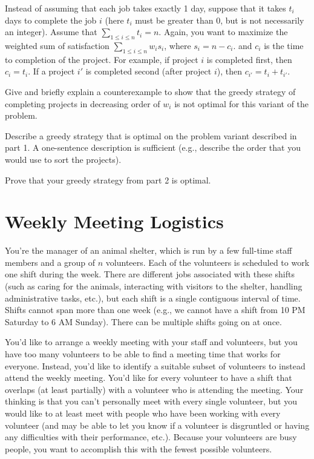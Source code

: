 \documentclass[11pt,fleqn]{exam}
\newif\ifsolutions\solutionsfalse
\begin{document}
\begin{questions}
    \question[3] Instead of assuming that each job takes exactly 1 day, suppose that it takes $t_i$ days to complete the job $i$ (here $t_i$ must be greater than 0, but is not necessarily an integer). Assume that $\sum_{1 \leq i \leq n}t_i = n$. Again, you want to maximize the weighted sum of satisfaction $\sum_{1 \leq i \leq n} w_i s_i$, where $s_i = n-c_i$. and $c_i$ is the time to completion of the project. For example, if project $i$ is completed first, then $c_i = t_i$. If a project $i'$ is completed second (after project $i$), then $c_{i'} =t_i + t_{i'}$.
	
	Give and briefly explain a counterexample to show that the greedy strategy of completing projects in decreasing order of $w_i$ is not optimal for this variant of the problem.

    \ifsolutions  \fi

    \question[2] Describe a greedy strategy that is optimal on the problem variant described in part 1. A one-sentence description is sufficient (e.g., describe the order that you would use to sort the projects).
     \ifsolutions  \fi

    \question[5] Prove that your greedy strategy from part 2 is optimal.
     \ifsolutions  \else \newpage \fi

\end{questions}
\section{Weekly Meeting Logistics}

You're the manager of an animal shelter, which is run by a few full-time staff members and a group of $n$ volunteers. Each of the volunteers is scheduled to work one shift during the week. There are different jobs associated with these shifts (such as caring for the animals, interacting with visitors to the shelter, handling administrative tasks, etc.), but each shift is a single contiguous interval of time. Shifts cannot span more than one week (e.g., we cannot have a shift from 10 PM Saturday to 6 AM Sunday). There can be multiple shifts going on at once.

You'd like to arrange a weekly meeting with your staff and volunteers, but you have too many volunteers to be able to find a meeting time that works for everyone. Instead, you'd like to identify a suitable subset of volunteers to instead attend the weekly meeting. You'd like for every volunteer to have a shift that overlaps (at least partially) with a volunteer who is attending the meeting. Your thinking is that you can't personally meet with every single volunteer, but you would like to at least meet with people who have been working with every volunteer (and may be able to let you know if a volunteer is disgruntled or having any difficulties with their performance, etc.). Because your volunteers are busy people, you want to accomplish this with the fewest possible volunteers.
\end{document}
